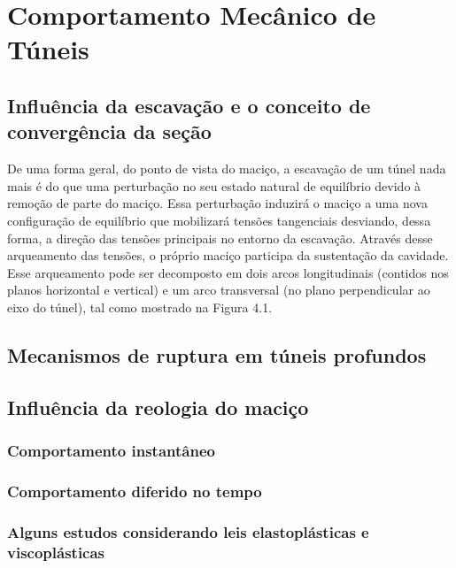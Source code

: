 \chapter{Comportamento Mecânico de Túneis}

\section{Influência da escavação e o conceito de convergência da seção}

De uma forma geral, do ponto de vista do maciço, a escavação de um túnel nada mais é do que uma perturbação no seu estado natural de equilíbrio devido à remoção de parte do maciço. Essa perturbação induzirá o maciço a uma nova configuração de equilíbrio que mobilizará tensões tangenciais desviando, dessa forma, a direção das tensões principais no entorno da escavação. Através desse arqueamento das tensões, o próprio maciço participa da sustentação da cavidade. Esse arqueamento pode ser decomposto em dois arcos longitudinais (contidos nos planos horizontal e vertical) e um arco transversal (no plano perpendicular ao eixo do túnel), tal como mostrado na Figura 4.1.










\section{Mecanismos de ruptura em túneis profundos}

\section{Influência da reologia do maciço}

\subsection{Comportamento instantâneo}

\subsection{Comportamento diferido no tempo}

\subsection{Alguns estudos considerando leis elastoplásticas e viscoplásticas}

